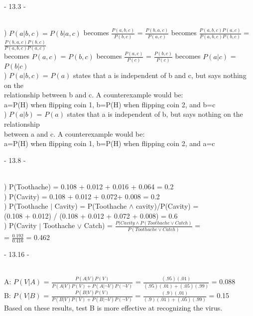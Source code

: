 \documentclass[12pt]{article}
\begin{document}
\centerline{- 13.3 - }
\ \\
) $P(a|b,c) = P(b|a,c)$ becomes {\Large $\frac{P(a,b,c)}{P(b,c)}$} = {\Large $\frac{P(b,a,c)}{P(a,c)}$} becomes {\Large $\frac{P(a,b,c)P(a,c)}{P(a,b,c)P(b,c)}$} = {\Large $\frac{P(b,a,c)P(b,c)}{P(a,b,c)P(a,c)}$}\\[.4em]
\indent becomes $P(a,c)$ = $P(b,c)$ becomes {\Large $\frac{P(a,c)}{P(c)}$} = {\Large $\frac{P(b,c)}{P(c)}$} becomes $P(a|c)$ = $P(b|c)$ {\large \checkmark}\\

) $P(a|b,c)$ = $P(a)$ states that a is independent of b and c, but says nothing on the \\
\indent relationship between b and c. A counterexample would be:\\
\indent a=P(H) when flipping coin 1, b=P(H) when flipping coin 2, and b=c\\

) $P(a|b)$ = $P(a)$ states that a is independent of b, but says nothing on the relationship \\
\indent between a and c. A counterexample would be:\\
\indent a=P(H) when flipping coin 1, b=P(H) when flipping coin 2, and a=c\\



\noindent \hrulefill


\centerline{- 13.8 - }
\ \\
) P(Toothache) = 0.108 + 0.012 + 0.016 + 0.064 = 0.2\\[.4em]
) P(Cavity) = 0.108 + 0.012 + 0.072+ 0.008 = 0.2\\[.4em]
) P(Toothache $|$ Cavity) = P(Toothache $\wedge$ cavity)/P(Cavity) = \\
\indent (0.108 + 0.012) / (0.108 + 0.012 + 0.072 + 0.008) = 0.6\\[.4em]
) P(Cavity $|$ Toothache $\vee$ Catch) = {\Large $\frac{P(Cavity \wedge P(Toothache \vee Catch)}{P(Toothache \vee Catch)}$} = \\[.4em]
 = {\Large $\frac{0.192}{0.416}$} = 0.462\\



\noindent \hrulefill


\centerline{- 13.16 - }
\ \\
\noindent A: $P(V|A)$ = {\Large $\frac{P(A|V)P(V)}{P(A|V)P(V)+P(A|\neg V)P(\neg V)}$} = {\Large $\frac{(.95)(.01)}{(.95)(.01) + (.05)(.99)}$} = 0.088\\[.4em]
\noindent B: $P(V|B)$ = {\Large $\frac{P(B|V)P(V)}{P(B|V)P(V)+P(B|\neg V)P(\neg V)}$} = {\Large $\frac{(.9)(.01)}{(.9)(.01) + (.05)(.99)}$} = 0.15\\[.4em]
\noindent Based on these results, test B is more effective at recognizing the virus.\\
\end{document}
